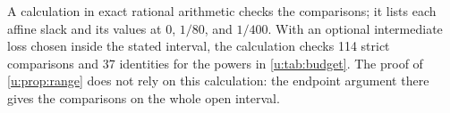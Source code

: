 A calculation in exact rational arithmetic checks the comparisons; it
lists each affine slack and its values at $0$, $1/80$, and $1/400$.
With an optional intermediate loss chosen inside the stated interval,
the calculation checks 114 strict comparisons and 37 identities for
the powers in \cref{u:tab:budget}. The proof of \cref{u:prop:range}
does not rely on this calculation: the endpoint argument there gives
the comparisons on the whole open interval.
